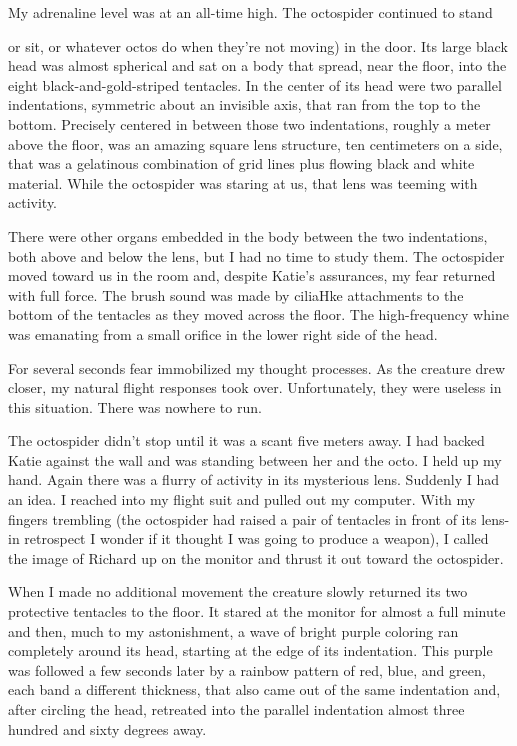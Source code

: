 \documentclass[]{article}
\begin{document}
My adrenaline level was at an all-time high.  The octospider continued to stand {or sit, or whatever octos do when they’re not moving) in the door.  Its large black head was almost spherical and sat on a body that spread, near the floor, into the eight black-and-gold-striped tentacles.  In the center of its head were two parallel indentations, symmetric about an invisible axis, that ran from the top to the bottom.  Precisely centered in between those two indentations, roughly a meter above the floor, was an amazing square lens structure, ten centimeters on a side, that was a gelatinous combination of grid lines plus flowing black and white material.  While the octospider was staring at us, that lens was teeming with activity.
	
	There were other organs embedded in the body between the two indentations, both above and below the lens, but I had no time to study them.  The octospider moved toward us in the room and, despite Katie’s assurances, my fear returned with full force.  The brush sound was made by ciliaHke attachments to the bottom of the tentacles as they moved across the floor.  The high-frequency whine was emanating from a small orifice in the lower right side of the head.
	
	For several seconds fear immobilized my thought processes.  As the creature drew closer, my natural flight responses took over.  Unfortunately, they were useless in this situation.  There was nowhere to run.
	
	The octospider didn’t stop until it was a scant five meters away.  I had backed Katie against the wall and was standing between her and the octo.  I held up my hand.  Again there was a flurry of activity in its mysterious lens.  Suddenly I had an idea.  I reached into my flight suit and pulled out my computer.  With my fingers trembling (the octospider had raised a pair of tentacles in front of its lens-in retrospect I wonder if it thought I was going to produce a weapon), I called the image of Richard up on the monitor and thrust it out toward the octospider.
	
	When I made no additional movement the creature slowly returned its two protective tentacles to the floor.  It stared at the monitor for almost a full minute and then, much to my astonishment, a wave of bright purple coloring ran completely around its head, starting at the edge of its indentation.  This purple was followed a few seconds later by a rainbow pattern of red, blue, and green, each band a different thickness, that also came out of the same indentation and, after circling the head, retreated into the parallel indentation almost three hundred and sixty degrees away.
	
}
\end{document}
